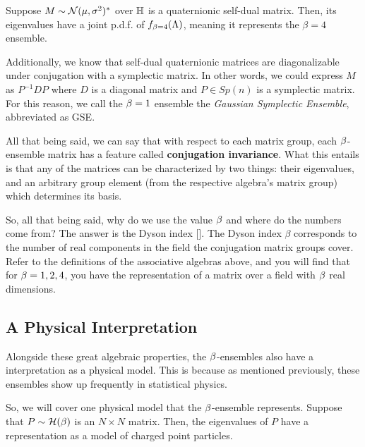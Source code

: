 \bigskip

 Suppose $M \sim \mathcal{N}(\mu,\sigma^2)^*$ over $\mathbb{H}$ is a quaternionic self-dual matrix.
Then, its eigenvalues have a joint p.d.f. of $f_{\beta = 4}(\Lambda)$, meaning it represents the $\beta = 4$ ensemble.

Additionally, we know that self-dual quaternionic matrices are diagonalizable under conjugation with a symplectic matrix.
In other words, we could express $M$ as $P^{-1} D P$ where $D$ is a diagonal matrix and $P \in Sp(n)$ is a symplectic matrix.
For this reason, we call the $\beta = 1$ ensemble the \textit{Gaussian Symplectic Ensemble}, abbreviated as GSE.

\bigskip

All that being said, we can say that with respect to each matrix group, each $\beta$-ensemble matrix has a feature called
\textbf{conjugation invariance}. What this entails is that any of the matrices can be characterized by two things: their eigenvalues, and an arbitrary group element (from the respective algebra's matrix group) which determines its basis.

\newpage

So, all that being said, why do we use the value $\beta$ and where do the numbers come from? The answer is the Dyson index [\cite{tao}].
The Dyson index $\beta$ corresponds to the number of real components in the field the conjugation matrix groups cover. Refer to the definitions
of the associative algebras above, and you will find that for $\beta = 1,2,4$, you have the representation of a matrix over a field with $\beta$ real dimensions.


\subsection{A Physical Interpretation}

Alongside these great algebraic properties, the $\beta$-ensembles also have a interpretation as a physical model.
This is because as mentioned previously, these ensembles show up frequently in statistical physics.

So, we will cover one physical model that the $\beta$-ensemble represents.
Suppose that $P \sim \mathcal{H}(\beta)$ is an $N \times N$ matrix. Then, the eigenvalues of $P$ have a representation as a model of charged point particles.

